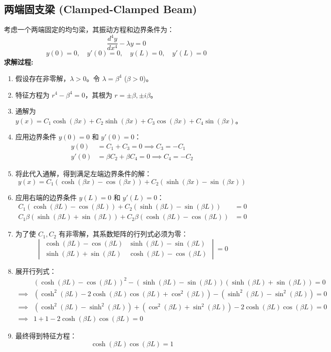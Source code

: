 \documentclass{article}
\begin{document}
	\subsection{两端固支梁 (Clamped-Clamped Beam)}
	考虑一个两端固定的均匀梁，其振动方程和边界条件为：
	$$
	\frac{d^4 y}{dx^4} - \lambda y = 0
	$$
	$$
	y(0)=0, \quad y'(0)=0, \quad y(L)=0, \quad y'(L)=0
	$$
	\textbf{求解过程:}
	\begin{enumerate}
		\item 假设存在非零解，$\lambda > 0$。令 $\lambda = \beta^4$ ($\beta > 0$)。
		\item 特征方程为 $r^4 - \beta^4 = 0$，其根为 $r = \pm \beta, \pm i\beta$。
		\item 通解为 $y(x) = C_1 \cosh(\beta x) + C_2 \sinh(\beta x) + C_3 \cos(\beta x) + C_4 \sin(\beta x)$。
		\item 应用边界条件 $y(0)=0$ 和 $y'(0)=0$：
		\begin{align*}
			y(0) &= C_1 + C_3 = 0 \implies C_3 = -C_1 \\
			y'(0) &= \beta C_2 + \beta C_4 = 0 \implies C_4 = -C_2
		\end{align*}
		\item 将此代入通解，得到满足左端边界条件的解：
		$$
		y(x) = C_1(\cosh(\beta x) - \cos(\beta x)) + C_2(\sinh(\beta x) - \sin(\beta x))
		$$
		\item 应用右端的边界条件 $y(L)=0$ 和 $y'(L)=0$：
		\begin{align*}
			C_1(\cosh(\beta L) - \cos(\beta L)) + C_2(\sinh(\beta L) - \sin(\beta L)) &= 0 \\
			C_1\beta(\sinh(\beta L) + \sin(\beta L)) + C_2\beta(\cosh(\beta L) - \cos(\beta L)) &= 0
		\end{align*}
		\item 为了使 $C_1, C_2$ 有非零解，其系数矩阵的行列式必须为零：
		$$
		\begin{vmatrix}
			\cosh(\beta L) - \cos(\beta L) & \sinh(\beta L) - \sin(\beta L) \\
			\sinh(\beta L) + \sin(\beta L) & \cosh(\beta L) - \cos(\beta L)
		\end{vmatrix} = 0
		$$
		\item 展开行列式：
		\begin{align*}
			&(\cosh(\beta L) - \cos(\beta L))^2 - (\sinh(\beta L) - \sin(\beta L))(\sinh(\beta L) + \sin(\beta L)) = 0 \\
			\implies &(\cosh^2(\beta L) - 2\cosh(\beta L)\cos(\beta L) + \cos^2(\beta L)) - (\sinh^2(\beta L) - \sin^2(\beta L)) = 0 \\
			\implies &(\cosh^2(\beta L) - \sinh^2(\beta L)) + (\cos^2(\beta L) + \sin^2(\beta L)) - 2\cosh(\beta L)\cos(\beta L) = 0 \\
			\implies &1 + 1 - 2\cosh(\beta L)\cos(\beta L) = 0
		\end{align*}
		\item 最终得到特征方程：
		$$
		\cosh(\beta L)\cos(\beta L) = 1
		$$
	\end{enumerate}
	
\end{document}
